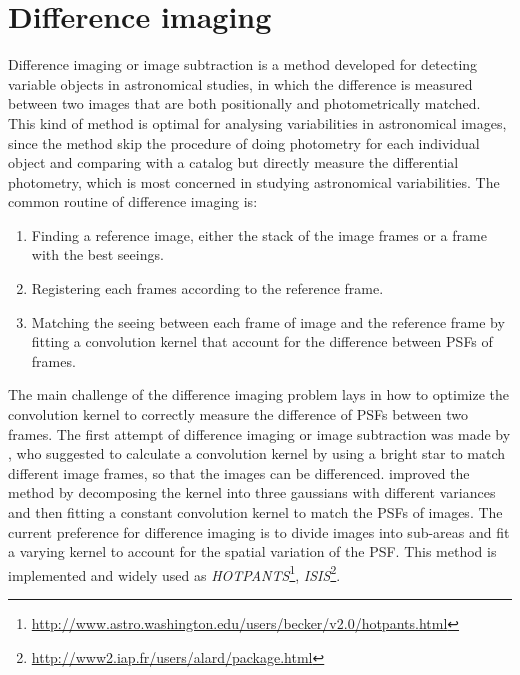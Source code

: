 \documentclass[12pt, preprint]{aastex}
\newcommand{\project}[1]{\textsl{#1}}
\begin{document}
\section{Difference imaging}
Difference imaging or image subtraction is a method developed for detecting variable objects in astronomical studies, in which the difference is measured between two images that are both positionally and photometrically matched. This kind of method is optimal for analysing variabilities in astronomical images, since the method skip the procedure of doing photometry for each individual object and comparing with a catalog but directly measure the differential photometry, which is most concerned in studying astronomical variabilities.
The common routine of difference imaging is:
\begin{enumerate}
\item
Finding a reference image, either the stack of the image frames or a frame with the best seeings.
\item
Registering each frames according to the reference frame.
\item
Matching the seeing between each frame of image and the reference frame by fitting a convolution kernel that account for the difference between PSFs of frames.
\end{enumerate}
The main challenge of the difference imaging problem lays in how to optimize the convolution kernel to correctly measure the difference of PSFs between two frames.
The first attempt of difference imaging or image subtraction was made by \cite{imagesub1}, who suggested to calculate a convolution kernel by using a bright star to match different image frames, so that the images can be differenced. 
\cite{alard} improved the method by decomposing the kernel into three gaussians with different variances and then fitting a constant convolution kernel to match the PSFs of images.
The current preference for difference imaging \citep{varyingkernel} is to divide images into sub-areas and fit a varying kernel to account for the spatial variation of the PSF. This method is implemented and widely used as \project{HOTPANTS}\footnote{\url{http://www.astro.washington.edu/users/becker/v2.0/hotpants.html}}, \project{ISIS}\footnote{\url{http://www2.iap.fr/users/alard/package.html}}.
\end{document}
